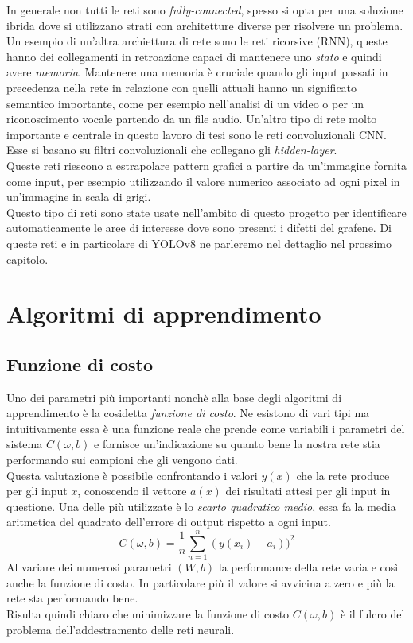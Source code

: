 \documentclass[12pt,a4paper,openright,twoside]{report}
\begin{document}
In generale non tutti le reti sono \emph{fully-connected}, spesso si opta per una soluzione ibrida dove si utilizzano strati con architetture diverse per risolvere un problema. 
Un esempio di un'altra archiettura di rete sono le reti ricorsive (RNN), queste hanno dei collegamenti in retroazione capaci di mantenere uno \emph{stato} e quindi avere \emph{memoria}. Mantenere una memoria è cruciale quando gli input passati in precedenza nella rete in relazione con quelli attuali hanno un significato semantico importante, come per esempio nell'analisi di un video o per un riconoscimento vocale partendo da un file audio.
Un'altro tipo di rete molto importante e centrale in questo lavoro di tesi sono le reti convoluzionali CNN. Esse si basano su filtri convoluzionali che collegano gli \emph{hidden-layer}.\\ Queste reti riescono a estrapolare pattern grafici a partire da un'immagine fornita come input, per esempio utilizzando il valore numerico associato ad ogni pixel in un'immagine in scala di grigi.\\
Questo tipo di reti sono state usate nell'ambito di questo progetto per identificare automaticamente le aree di interesse dove sono presenti i difetti del grafene. Di queste reti e in particolare di YOLOv8 ne parleremo nel dettaglio nel prossimo capitolo.

\newpage
\section{Algoritmi di apprendimento}
\subsection{Funzione di costo}
Uno dei parametri più importanti nonchè alla base degli algoritmi di apprendimento è la cosidetta \emph{funzione di costo}.
Ne esistono di vari tipi ma intuitivamente essa è una funzione reale che prende come variabili i parametri del sistema $C(\omega,b)$ e fornisce un'indicazione su quanto bene la nostra rete stia performando sui campioni che gli vengono dati.\\
Questa valutazione è possibile confrontando i valori $y(x)$ che la rete produce per gli input $x$, conoscendo il vettore $a(x)$ dei risultati attesi per gli input in questione.
Una delle più utilizzate è lo \emph{scarto quadratico medio}, essa fa la media aritmetica del quadrato dell'errore di output rispetto a ogni input.
\begin{equation}
    C(\omega,b) = \frac{1}{n} \sum_{n=1}^{n} (y(x_{i}) - a_{i}))^2
\end{equation}
Al variare dei numerosi parametri $(W,b)$ la performance della rete varia e così anche la funzione di costo. In particolare più il valore si avvicina a zero e più la rete sta performando bene. \\
Risulta quindi chiaro che minimizzare la funzione di costo $C(\omega,b)$ è il fulcro del problema dell'addestramento delle reti neurali.
\end{document}
